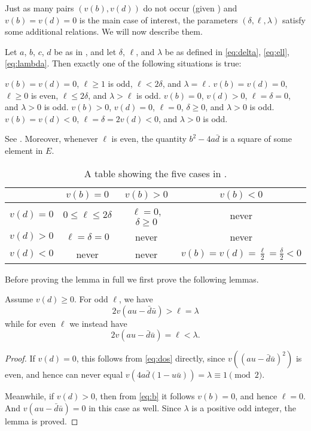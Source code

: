 Just as many pairs $(v(b), v(d))$ do not occur (given )
and $v(b) = v(d) = 0$ is the main case of interest,
the parameters $(\delta, \ell, \lambda)$ satisfy some additional relations.
We will now describe them.

\begin{lemma}
  \label{lem:parameter_constraints}
  Let $a$, $b$, $c$, $d$ be as in ,
  and let $\delta$, $\ell$, and $\lambda$ be as defined in
  \eqref{eq:delta}, \eqref{eq:ell}, \eqref{eq:lambda}.
  Then exactly one of the following situations is true:
  \begin{itemize}
    \ii $v(b) = v(d) = 0$, $\ell \ge 1$ is odd, $\ell < 2 \delta$, and $\lambda = \ell$.
    \ii $v(b) = v(d) = 0$, $\ell \ge 0$ is even, $\ell \le 2 \delta$, and $\lambda > \ell$ is odd.
    \ii $v(b) = 0$, $v(d) > 0$, $\ell = \delta = 0$, and $\lambda > 0$ is odd.
    \ii $v(b) > 0$, $v(d) = 0$, $\ell = 0$, $\delta \ge 0$, and $\lambda > 0$ is odd.
    \ii $v(b) = v(d) < 0$, $\ell = \delta = 2v(d) < 0$, and $\lambda > 0$ is odd.
  \end{itemize}
  See .
  Moreover, whenever $\ell$ is even,
  the quantity $b^2 - 4 a \bar d$ is a square of some element in $E$.
\end{lemma}

\begin{table}[ht]
  \centering
  \begin{tabular}{cccc}
    \toprule
    & $v(b) = 0$ & $v(b) > 0$ & $v(b) < 0$ \\
    \midrule
    $v(d) = 0$ & $0 \le \ell \le 2 \delta$ & $\ell = 0$, $\delta \ge 0$ & never \\
    $v(d) > 0$ & $\ell = \delta = 0$ & never & never \\
    $v(d) < 0$ & never & never & $v(b) = v(d) = \frac{\ell}{2} = \frac{\delta}{2} < 0$ \\
    \bottomrule
  \end{tabular}
  \caption{A table showing the five cases in .}
  \label{tab:parameter_constraints}
\end{table}

Before proving the lemma in full we first prove the following lemmas.
\begin{lemma}
  \label{lem:au_minus_du}
  Assume $v(d) \ge 0$.
  For odd $\ell$, we have
  \[ 2 v(au - \bar d \bar u) > \ell = \lambda \]
  while for even $\ell$ we instead have
  \[ 2 v(au - \bar d \bar u) = \ell < \lambda. \]
\end{lemma}
\begin{proof}
  If $v(d) = 0$, this follows from \eqref{eq:dos} directly,
  since $v\left( (au - \bar d \bar u)^2 \right)$ is even, and hence
  can never equal $v(4a \bar d (1- u \bar u)) = \lambda \equiv 1 \pmod 2$.

  Meanwhile, if $v(d) > 0$, then from \eqref{eq:b}
  it follows $v(b) = 0$, and hence $\ell = 0$.
  And $v(au - \bar d \bar u) = 0$ in this case as well.
  Since $\lambda$ is a positive odd integer, the lemma is proved.
\end{proof}

